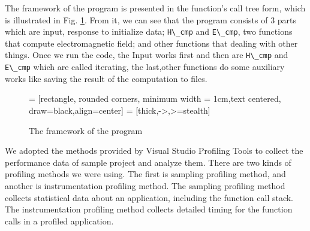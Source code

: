 The framework of the program is presented in the function’s call tree form, which is illustrated in Fig. \ref{ch3 workflow:calltree}. From it, we can see that the program consists of 3 parts which are input, response to initialize data; \lstinline|H\_cmp| and \lstinline|E\_cmp|, two functions that compute electromagnetic field; and other functions that dealing with other things. Once we run the code, the Input works first and then are \lstinline|H\_cmp| and \lstinline|E\_cmp| which are called iterating, the last,other functions do some auxiliary works like saving the result of the computation to files.

\begin{figure}
	\centering
	 = [rectangle, rounded corners, minimum width = 1cm,text centered, draw=black,align=center]
	 = [thick,->,>=stealth]
	\caption{The framework of the program}
	\label{ch3 workflow:calltree}
\end{figure}

We adopted the methods provided by Visual Studio Profiling Tools to collect the performance data of sample project and analyze them. There are two kinds of profiling methods we were using. The first is sampling
profiling method, and another is instrumentation profiling method. The sampling profiling method collects statistical data about an application, including the function call stack. The instrumentation profiling method collects detailed timing for the function calls in a profiled application. 


